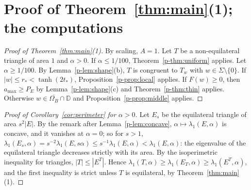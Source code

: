 \documentclass[11pt]{article}
\theoremstyle{remark}
\newcommand{\E}{E}
\begin{document}
\section{Proof of Theorem~\ref{thm:main}(1); the computations}\label{p-sec:proof}

\begin{proof}[Proof of Theorem~\ref{thm:main}\textup{(1)}]
By scaling, $A=1$. Let $T$ be a non-equilateral triangle of area $1$ and $\alpha>0$. If
$\alpha\le1/100$, Theorem~\ref{p-thm:uniform} applies. Let $\alpha\ge1/100$. By
Lemma~\ref{p-lem:shape}(b), $T$ is congruent to $T_w$ with $w\in\Sigma\setminus\{0\}$. If
$|w|\le r_*<\tanh(2t_*)$, Proposition~\ref{p-prop:local} applies. If $F(w)\ge0$, then
$a_{\max}\ge P_E$ by Lemma~\ref{p-lem:shape}(c) and Theorem~\ref{p-thm:thin} applies. Otherwise
$w\in\overline{\Omega_B}\cap\mathbb D$ and Proposition~\ref{p-prop:middle} applies.
\end{proof}

\begin{proof}[Proof of Corollary~\ref{cor:perimeter} for $\alpha>0$]
Let $E_s$ be the equilateral triangle of area $s^2|E|$. By the remark after
Lemma~\ref{p-lem:concave}, $\alpha\mapsto\lambda_1(E,\alpha)$ is concave, and it vanishes at $\alpha=0$; so for
$s>1$, $\lambda_1(E_s,\alpha)=s^{-2}\lambda_1(E,s\alpha)\le s^{-1}\lambda_1(E,\alpha)<\lambda_1(E,\alpha)$:
the eigenvalue of the equilateral triangle decreases strictly with its area. By the isoperimetric
inequality for triangles, $|T|\le|\E^T|$. Hence
$\lambda_1(T,\alpha)\ge\lambda_1(\E_T,\alpha)\ge\lambda_1(\E^T,\alpha)$, and the first inequality is strict
unless $T$ is equilateral, by Theorem~\ref{thm:main}(1).
\end{proof}
\end{document}
